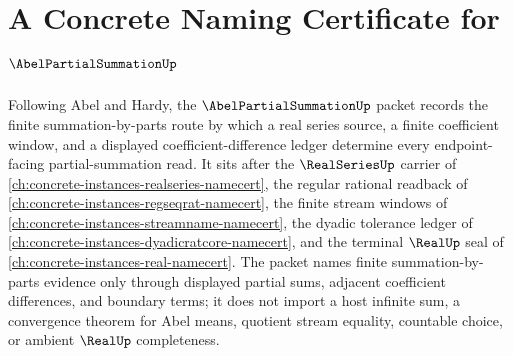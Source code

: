 \chapter{A Concrete Naming Certificate for $\AbelPartialSummationUp$}
\label{ch:concrete-instances-abel-partial-summation-namecert}

Following Abel and Hardy, the $\AbelPartialSummationUp$ packet records the finite summation-by-parts route by which a real series source, a finite coefficient window, and a displayed coefficient-difference ledger determine every endpoint-facing partial-summation read. It sits after the $\RealSeriesUp$ carrier of \autoref{ch:concrete-instances-realseries-namecert}, the regular rational readback of \autoref{ch:concrete-instances-regseqrat-namecert}, the finite stream windows of \autoref{ch:concrete-instances-streamname-namecert}, the dyadic tolerance ledger of \autoref{ch:concrete-instances-dyadicratcore-namecert}, and the terminal $\RealUp$ seal of \autoref{ch:concrete-instances-real-namecert}. The packet names finite summation-by-parts evidence only through displayed partial sums, adjacent coefficient differences, and boundary terms; it does not import a host infinite sum, a convergence theorem for Abel means, quotient stream equality, countable choice, or ambient $\RealUp$ completeness.

